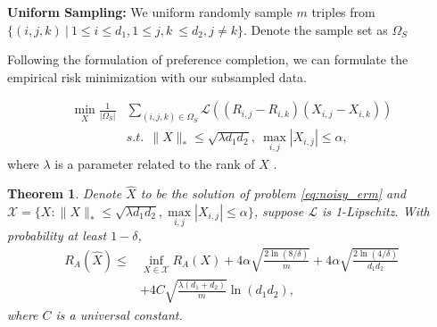 \documentclass[conference]{IEEEtran}
\numberwithin{equation}{section}
\newtheorem{theorem}{Theorem}
\newtheorem{sampling strategy}{Sampling Strategy}
\begin{document}
\textbf{Uniform Sampling:} We uniform randomly sample $m$ triples from $\{(i,j,k)~|~ 1 \leq i \leq d_1, 1 \leq j, k\ \leq d_2, j \neq k \}$. Denote the sample set as $\Omega_S$

Following the formulation of preference completion, we can formulate the empirical risk minimization with our subsampled data.

\begin{equation}
\begin{aligned}
    \underset{X}{\min}  \frac{1}{|\Omega_S|} & \sum_{(i,j,k) \in \Omega_S}  \mathcal{L}( (R_{i,j} - R_{i,k})(X_{i,j} - X_{i,k}) ) \\
    & s.t. ~~ \|X\|_* \leq \sqrt{\lambda d_1 d_2},~ \max_{i,j} |X_{i,j}| \leq \alpha,
    \label{eq:noisy_erm}
\end{aligned}
\end{equation}
where $\lambda$ is a parameter related to the rank of $X$ \cite{cr}.

\begin{theorem}
Denote $\hat{X}$ to be the solution of problem \ref{eq:noisy_erm} and $\mathcal{X} = \{X: \|X\|_* \leq \sqrt{\lambda d_1 d_2}, \underset{i,j}{\max} |X_{i,j}| \leq \alpha \}$, suppose $\mathcal{L}$ is 1-Lipschitz.  With probability at least $1 - \delta$,
\begin{equation}
\begin{aligned}
R_A(\hat{X}) \leq & \underset{X\in \mathcal{X}}{\inf} R_A(X) + 4 \alpha \sqrt{\frac{2\ln(8/\delta)}{m}} + 4\alpha \sqrt{ \frac{2\ln(4/\delta) }{d_1 d_2} } \\
        & + 4 C \sqrt{\frac{\lambda (d_1 + d_2)}{m}} \ln(d_1 d_2),
\end{aligned}
\end{equation} 
where $C$ is a universal constant.
\label{thm:noisy}
\end{theorem}
\end{document}
